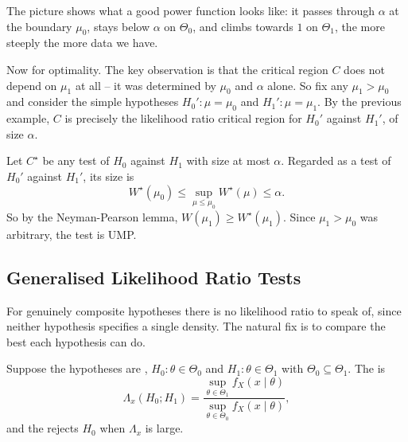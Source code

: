 \begin{example}
\begin{center}
  \end{center}

  The picture shows what a good power function looks like: it passes through $\alpha$ at the boundary $\mu_0$, stays below $\alpha$ on $\Theta_0$, and climbs towards $1$ on $\Theta_1$, the more steeply the more data we have.

  Now for optimality. The key observation is that the critical region $C$ does not depend on $\mu_1$ at all -- it was determined by $\mu_0$ and $\alpha$ alone. So fix any $\mu_1 > \mu_0$ and consider the simple hypotheses $H_0' : \mu = \mu_0$ and $H_1' : \mu = \mu_1$. By the previous example, $C$ is precisely the likelihood ratio critical region for $H_0'$ against $H_1'$, of size $\alpha$.

  Let $C^\star$ be any test of $H_0$ against $H_1$ with size at most $\alpha$. Regarded as a test of $H_0'$ against $H_1'$, its size is
  $$
  W^\star(\mu_0) \leq \sup_{\mu \leq \mu_0}W^\star(\mu) \leq \alpha.
  $$
  So by the Neyman-Pearson lemma, $W(\mu_1) \geq W^\star(\mu_1)$. Since $\mu_1 > \mu_0$ was arbitrary, the test is UMP.
\end{example}

\subsection{Generalised Likelihood Ratio Tests}

For genuinely composite hypotheses there is no likelihood ratio to speak of, since neither hypothesis specifies a single density. The natural fix is to compare the best each hypothesis can do.

\begin{definition}
  Suppose the hypotheses are , $H_0 : \theta \in \Theta_0$ and $H_1 : \theta \in \Theta_1$ with $\Theta_0 \subseteq \Theta_1$. The  is
  $$
  \Lambda_x(H_0;H_1) = \frac{\sup_{\theta\in\Theta_1}f_X(x\mid\theta)}{\sup_{\theta\in\Theta_0}f_X(x\mid\theta)},
  $$
  and the  rejects $H_0$ when $\Lambda_x$ is large.
\end{definition}

